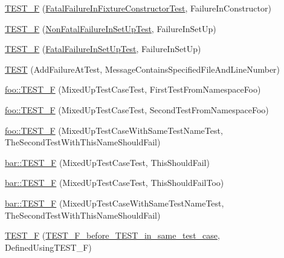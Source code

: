 \begin{DoxyCompactItemize}
\mbox{\hyperlink{googletest-output-test___8cc_a858b341fa0b2298c1534b1325fedf797}{T\+E\+S\+T\+\_\+F}} (\mbox{\hyperlink{classFatalFailureInFixtureConstructorTest}{Fatal\+Failure\+In\+Fixture\+Constructor\+Test}}, Failure\+In\+Constructor)
\item 
\mbox{\hyperlink{googletest-output-test___8cc_aaa9d6fcc5d9910aedb42ff3db3cc313c}{T\+E\+S\+T\+\_\+F}} (\mbox{\hyperlink{classNonFatalFailureInSetUpTest}{Non\+Fatal\+Failure\+In\+Set\+Up\+Test}}, Failure\+In\+Set\+Up)
\item 
\mbox{\hyperlink{googletest-output-test___8cc_a52057afc95d69adbae1fbe0ef92b29d7}{T\+E\+S\+T\+\_\+F}} (\mbox{\hyperlink{classFatalFailureInSetUpTest}{Fatal\+Failure\+In\+Set\+Up\+Test}}, Failure\+In\+Set\+Up)
\item 
\mbox{\hyperlink{googletest-output-test___8cc_a62631ea26f8f98f3f19dc03f950dc197}{T\+E\+ST}} (Add\+Failure\+At\+Test, Message\+Contains\+Specified\+File\+And\+Line\+Number)
\item 
\mbox{\hyperlink{namespacefoo_a0d50eecc97df56ae625078848ba9c98a}{foo\+::\+T\+E\+S\+T\+\_\+F}} (Mixed\+Up\+Test\+Case\+Test, First\+Test\+From\+Namespace\+Foo)
\item 
\mbox{\hyperlink{namespacefoo_a7911fd62b6ae405016caed779b2f95dc}{foo\+::\+T\+E\+S\+T\+\_\+F}} (Mixed\+Up\+Test\+Case\+Test, Second\+Test\+From\+Namespace\+Foo)
\item 
\mbox{\hyperlink{namespacefoo_a2bc2a2547ff38da0ecf68676e75583cd}{foo\+::\+T\+E\+S\+T\+\_\+F}} (Mixed\+Up\+Test\+Case\+With\+Same\+Test\+Name\+Test, The\+Second\+Test\+With\+This\+Name\+Should\+Fail)
\item 
\mbox{\hyperlink{namespacebar_a0e342ef00f400f593f866279689c55ac}{bar\+::\+T\+E\+S\+T\+\_\+F}} (Mixed\+Up\+Test\+Case\+Test, This\+Should\+Fail)
\item 
\mbox{\hyperlink{namespacebar_adf88eb6e7ed65a5bd641aa80b237ea2c}{bar\+::\+T\+E\+S\+T\+\_\+F}} (Mixed\+Up\+Test\+Case\+Test, This\+Should\+Fail\+Too)
\item 
\mbox{\hyperlink{namespacebar_a600f9a0c34015b598089fb6b69adc63a}{bar\+::\+T\+E\+S\+T\+\_\+F}} (Mixed\+Up\+Test\+Case\+With\+Same\+Test\+Name\+Test, The\+Second\+Test\+With\+This\+Name\+Should\+Fail)
\item 
\mbox{\hyperlink{googletest-output-test___8cc_ae71a8d4934e768af615b9b09418f15c3}{T\+E\+S\+T\+\_\+F}} (\mbox{\hyperlink{classTEST__F__before__TEST__in__same__test__case}{T\+E\+S\+T\+\_\+\+F\+\_\+before\+\_\+\+T\+E\+S\+T\+\_\+in\+\_\+same\+\_\+test\+\_\+case}}, Defined\+Using\+T\+E\+S\+T\+\_\+F)

\end{DoxyCompactItemize}
